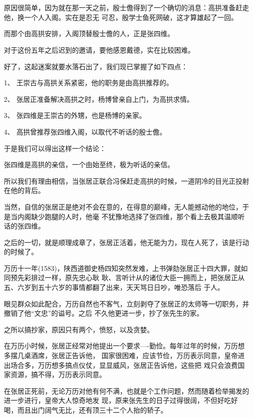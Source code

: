 \documentclass[11pt,a4paper,onecolumn]{article}
\begin{document}
\section[\thesection]{}

原因很简单，因为就在那一天之前，殷士儋得到了一个确切的消息：高拱准备赶走他，换一个人入阁。实在是忍无
可忍，殷学士鱼死网破，这才算雄起了一回。

而那个由高拱安排，入阁顶替殷士儋的人，正是张四维。

对于这份五年之后迟到的邀请，要他感恩戴德，实在比较困难。

好了，这起迷案就要水落石出了，我们现已掌握了如下四点：

1、 王崇古与高拱关系紧密，他的职务是由高拱推荐的。

2、 张居正准备解决高拱之时，杨博曾亲自上门，为高拱求情。

3、 张四维是王崇古的外甥，也是杨博的亲家。

4、 高拱曾推荐张四维入阁，以取代不听话的殷士儋。

于是我们可以得出这样一个结论：

张四维是高拱的亲信，一个由始至终，极为听话的亲信。

所以我们有理由相信，当张居正联合冯保赶走高拱的时候，一道阴冷的目光正投射在他的背后。

当然，自信的张居正是绝对不会在意的，在得意的巅峰，无人能撼动他的地位，于是当内阁缺少跑腿的人时，他毫
不犹豫地选择了张四维，那个看上去极其温顺听话的张四维。

之后的一切，就是顺理成章了，张居正活着，他无能为力，现在人死了，该是行动的时候了。

万历十一年(1583)，陕西道御史杨四知突然发难，上书弹劾张居正十四大罪，就如同预先彩排过一样，原先忠心耿
耿、言听计从的诸位大臣一拥而上，把张居正从五、六岁到五十六岁的事情都翻了出来，天天骂日日吵，唯恐落后
于人。

眼见群众如此配合，万历自然也不客气，立刻剥夺了张居正的太师等一切职务，并撤销了他``文忠''的谥号。之后
不久他更进一步，抄了张先生的家。

之所以搞抄家，原因只有两个，愤怒，以及贪婪。

在万历小时候，张居正经常对他提出一个要求----勤俭。每年过年的时候，万历想多摆几桌酒席，张居正告诉他，
国家很困难，应该节俭，万历表示同意，皇帝进出场合多，万历想多搞点仪仗，显显威风，张居正告诉他，这些把
戏只会浪费国家资源，搞不得，万历表示同意。

在张居正死前，无论万历对他有何不满，也就是个工作问题，然而随着检举揭发的进一步进行，皇帝大人惊奇地发
现，原来张先生的日子过得很阔，不但好吃好喝，而且出门阔气无比，还有顶三十二个人抬的轿子。
\end{document}
